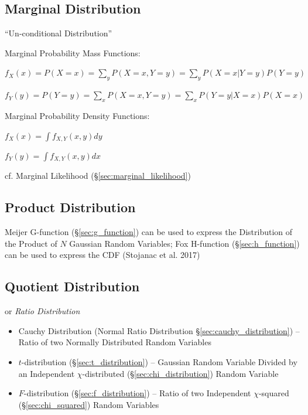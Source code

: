 \subsection{Marginal Distribution}\label{sec:marginal_distribution}

``Un-conditional Distribution''

Marginal Probability Mass Functions:

$f_X(x) = P(X = x) = \sum_y P(X = x, Y = y) = \sum_y P(X = x | Y = y) P(Y = y)$

$f_Y(y) = P(Y = y) = \sum_x P(X = x, Y = y) = \sum_x P(Y = y | X = x) P(X = x)$

Marginal Probability Density Functions:

$f_X(x) = \int f_{X,Y}(x,y) dy$

$f_Y(y) = \int f_{X,Y}(x,y) dx$

\fist cf. Marginal Likelihood (\S\ref{sec:marginal_likelihood})



\subsection{Product Distribution}\label{sec:product_distribution}

\fist Meijer G-function (\S\ref{sec:g_function}) can be used to express the
Distribution of the Product of $N$ Gaussian Random Variables; Fox H-function
(\S\ref{sec:h_function}) can be used to express the CDF (Stojanac et al. 2017)



\subsection{Quotient Distribution}\label{sec:quotient_distribution}

or \emph{Ratio Distribution}

\begin{itemize}
  \item Cauchy Distribution (Normal Ratio Distribution
    \S\ref{sec:cauchy_distribution}) -- Ratio of two Normally Distributed Random
    Variables
  \item $t$-distribution (\S\ref{sec:t_distribution}) -- Gaussian Random
    Variable Divided by an Independent $\chi$-distributed
    (\S\ref{sec:chi_distribution}) Random Variable
  \item $F$-distribution (\S\ref{sec:f_distribution}) -- Ratio of two
    Independent $\chi$-squared (\S\ref{sec:chi_squared}) Random Variables
\end{itemize}



